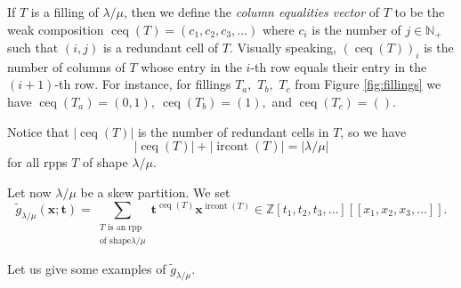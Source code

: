 \documentclass[numbers=enddot,12pt,final,onecolumn,notitlepage]{scrartcl}%
\theoremstyle{definition}
\let\sumnonlimits\sum
\renewcommand{\sum}{\sumnonlimits\limits}
\def\ceq{{\operatorname{ceq}}}
\def\ircont{{\operatorname{ircont}}}
\def\t{{\mathbf{t}}}
\def\lm{{\lambda/\mu}}
\def\Z{{\mathbb{Z}}}
\begin{document}
 If $T$ is a filling of $\lm$,
then we define the \textit{column equalities vector} of $T$ to be the weak composition
$\operatorname{ceq}\left(  T\right)=\left(c_1,c_2,c_3,\dots\right)$
where $c_i$ is the number of $j\in\mathbb{N}_{+}$ such that $\left(  i,j\right)$ is a redundant cell of $T$. Visually speaking, $\left(  \operatorname{ceq}\left(  T\right)  \right)
_{i}$ is the number of columns of $T$ whose entry in the $i$-th row equals
their entry in the $\left(  i+1\right)  $-th row. For instance, for fillings $T_a,$ $T_b,$ $T_c$ from Figure \ref{fig:fillings} we have $\ceq(T_a)=(0,1),\ \ceq(T_b)=(1),$ and $\ceq(T_c)=()$.

Notice that $\left|\ceq(T)\right|$ is the number of redundant cells in $T$, so we have 
\begin{equation}\label{eq:sum.of.ceq.and.ircont}
 \left|\ceq(T)\right|+\left|\ircont(T)\right|=\left|\lm\right|
\end{equation}
 for all rpps $T$ of shape $\lm$. 




Let now $\lambda/\mu$ be a skew partition. We set%
\[
\widetilde{g}_{\lambda/\mu}(\mathbf{x};\t)=\sum_{\substack{T\text{ is an rpp}\\\text{of shape
}\lm  }}\mathbf{t}^{\operatorname*{ceq}\left(
T\right)  }\mathbf{x}^{\operatorname*{ircont}\left(  T\right)  }
\in \Z\left[t_1, t_2, t_3, \ldots\right]\left[\left[x_1, x_2, x_3, \ldots\right]\right] .
\]


Let us give some examples of $\widetilde{g}_{\lambda/\mu}$.
\end{document}
